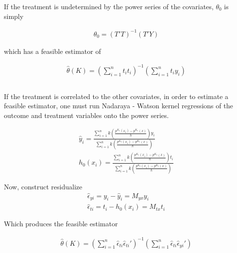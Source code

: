 \documentclass[12pt]{article}
\begin{document}
\subsubsection{}

If the treatment is undetermined by the power series of the covariates, $\theta_0$ is simply

\begin{gather*}
\theta_0 = (T'T)^{-1}(T'Y)
\end{gather*}

which has a feasible estimator of

\begin{gather*}
\hat{\theta}(K) =(\sum\limits_{i=1}^{n} t_i t_i)^{-1}  (\sum\limits_{i=1}^{n} t_i y_i)\\
\end{gather*}



\subsubsection{}
If the treatment is correlated to the other covariates, in order to estimate a feasible estimator, one must run Nadaraya - Watson kernel regressions of the outcome and treatment variables onto the power series.

\begin{gather*}
\hat{y}_i = \frac{\sum\limits_{i=1}^{n} k\left(\frac{p^{K_n}(x_i) - p^{K_n}(x)}{h}\right) y_i}{\sum\limits_{i=1}^{n} k\left(\frac{p^{K_n}(x_i) - p^{K_n}(x)}{h}\right)} \\
h_0(x_i) = \frac{\sum\limits_{i=1}^{n} k\left(\frac{p^{K_n}(x_i) - p^{K_n}(x)}{h}\right) t_i}{\sum\limits_{i=1}^{n} k\left(\frac{p^{K_n}(x_i) - p^{K_n}(x)}{h}\right)}
\end{gather*}

Now, construct residualize
\begin{gather*}
\hat{\epsilon}_{yi} = y_i - \hat{y}_i = M_{yx}y_i \\
\hat{\epsilon}_{ti} = t_i - h_0(x_i)   = M_{tx}t_i
\end{gather*}

Which produces the feasible estimator

\begin{gather*}
\hat{\theta}(K) = \left( \sum\limits_{i=1}^n \hat{\epsilon}_{ti} \hat{\epsilon}_{ti}' \right)^{-1} \left( \sum\limits_{i=1}^n \hat{\epsilon}_{ti} \hat{\epsilon}_{yi}' \right)
\end{gather*}
\end{document}
